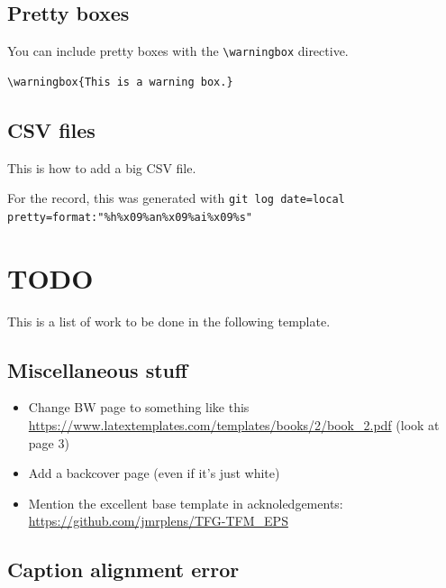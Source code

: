 \subsection{Pretty boxes}

You can include pretty boxes with the \texttt{\textbackslash warningbox} directive.

\begin{lstlisting}[style=Latex-color]
\warningbox{This is a warning box.}
\end{lstlisting}


\subsection{CSV files}

This is how to add a big CSV file.

For the record, this was generated with \texttt{git log \-\-date=local \-\-pretty=format:"\%h\%x09\%an\%x09\%ai\%x09\%s"}


\section{TODO}

This is a list of work to be done in the following template.

\subsection{Miscellaneous stuff}

\begin{itemize}
    \item Change BW page to something like this \url{https://www.latextemplates.com/templates/books/2/book_2.pdf} (look at page 3)
    \item Add a backcover page (even if it's just white)
    \item Mention the excellent base template in acknoledgements: \url{https://github.com/jmrplens/TFG-TFM_EPS}
\end{itemize}

\subsection{Caption alignment error}

